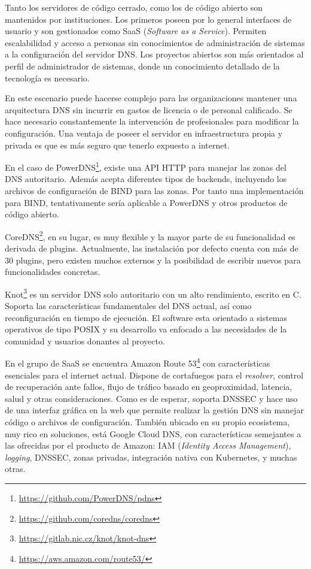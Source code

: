 Tanto los servidores de código cerrado, como los de código abierto son mantenidos por instituciones. Los primeros poseen por lo general interfaces de usuario y son gestionados como SaaS (\textit{Software as a Service}). Permiten escalabilidad y acceso a personas sin conocimientos de administración de sistemas a la configuración del servidor DNS. Los proyectos abiertos son más orientados al perfil de administrador de sistemas, donde un conocimiento detallado de la tecnología es necesario.

En este escenario puede hacerse complejo para las organizaciones mantener una arquitectura DNS sin incurrir en gastos de licencia o de personal calificado. Se hace necesario constantemente la intervención de profesionales para modificar la configuración. Una ventaja de poseer el servidor en infraestructura propia y privada es que es más seguro que tenerlo expuesto a internet.

En el caso de PowerDNS\footnote{\url{https://github.com/PowerDNS/pdns}}, existe una API HTTP para manejar las zonas del DNS autoritario. Además acepta diferentes tipos de backends, incluyendo los archivos de configuración de BIND para las zonas. Por tanto una implementación para BIND, tentativamente sería aplicable a PowerDNS y otros productos de código abierto.

CoreDNS\footnote{\url{https://github.com/coredns/coredns}}, en su lugar, es muy flexible y la mayor parte de su funcionalidad es derivada de plugins. Actualmente, las instalación por defecto cuenta con más de 30 plugins, pero existen muchos externos y la posibilidad de escribir nuevos para funcionalidades concretas.

Knot\footnote{\url{https://gitlab.nic.cz/knot/knot-dns}} es un servidor DNS solo autoritario con un alto rendimiento, escrito en C. Soporta las características fundamentales del DNS actual, así como reconfiguración en tiempo de ejecución. El software esta orientado a sistemas operativos de tipo POSIX y su desarrollo va enfocado a las necesidades de la comunidad y usuarios donantes al proyecto.

En el grupo de SaaS se encuentra Amazon Route 53\footnote{\url{https://aws.amazon.com/route53/}} con características esenciales para el internet actual. Dispone de cortafuegos para el \textit{resolver}, control de recuperación ante fallos, flujo de tráfico basado en geoproximidad, latencia, salud y otras consideraciones. Como es de esperar, soporta DNSSEC y hace uso de una interfaz gráfica en la web que permite realizar la gestión DNS sin manejar código o archivos de configuración. También ubicado en su propio ecosistema, muy rico en soluciones, está Google Cloud DNS, con características semejantes a las ofrecidas por el producto de Amazon: IAM (\textit{Identity Access Management}), \textit{logging}, DNSSEC, zonas privadas, integración nativa con Kubernetes, y muchas otras.

